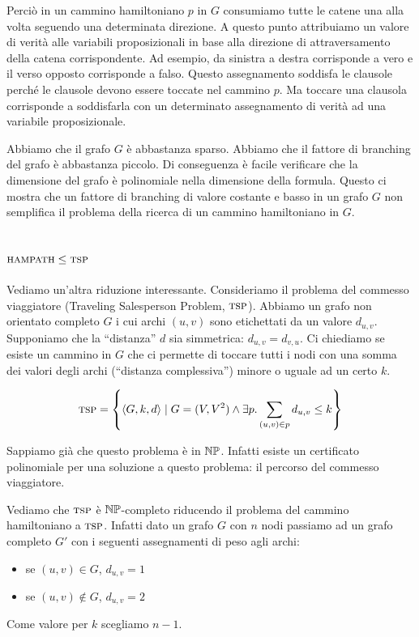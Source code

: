 Perciò in un cammino hamiltoniano $p$ in $G$ consumiamo tutte le catene una alla volta seguendo una
determinata direzione. A questo punto attribuiamo un valore di verità alle variabili proposizionali
in base alla direzione di attraversamento della catena corrispondente. Ad esempio, da sinistra a
destra corrisponde a vero e il verso opposto corrisponde a falso. Questo assegnamento soddisfa le
clausole perché le clausole devono essere toccate nel cammino $p$. Ma toccare una clausola
corrisponde a soddisfarla con un determinato assegnamento di verità ad una variabile
proposizionale.

Abbiamo che il grafo $G$ è abbastanza sparso. Abbiamo che il fattore di branching del grafo è
abbastanza piccolo. Di conseguenza è facile verificare che la dimensione del grafo è polinomiale
nella dimensione della formula. Questo ci mostra che un fattore di branching di valore costante e
basso in un grafo $G$ non semplifica il problema della ricerca di un cammino hamiltoniano in $G$.

\subsection{$\textsc{hampath} \leq \textsc{tsp}$}

Vediamo un'altra riduzione interessante. Consideriamo il problema del commesso viaggiatore
(Traveling Salesperson Problem, $\textsc{tsp}$). Abbiamo un grafo non orientato completo $G$ i cui archi
$(u,v)$ sono etichettati da un valore $d_{u,v}$. Supponiamo che la ``distanza'' $d$ sia simmetrica:
$d_{u,v} = d_{v,u}$. Ci chiediamo se esiste un cammino in $G$ che ci permette di toccare tutti i
nodi con una somma dei valori degli archi (``distanza complessiva'') minore o uguale ad un certo
$k$.

\begin{equation*}
    \textsc{tsp} = \left\{\langle G,k,d \rangle \mid G = (V,V^{2}) \land \exists p. \sum_{(u,v)\in p}d_{u,v} \leq k\right\}
\end{equation*}

Sappiamo già che questo problema è in $\mathbb{NP}$. Infatti esiste un certificato polinomiale per
una soluzione a questo problema: il percorso del commesso viaggiatore.

Vediamo che $\textsc{tsp}$ è $\mathbb{NP}$-completo riducendo il problema del cammino hamiltoniano a $\textsc{tsp}$.
Infatti dato un grafo $G$ con $n$ nodi passiamo ad un grafo completo $G'$ con i seguenti
assegnamenti di peso agli archi:
\begin{itemize}
    \item se $(u,v) \in G$, $d_{u,v} = 1$ 
    \item se $(u,v) \notin G$, $d_{u,v} = 2$ 
\end{itemize}
Come valore per $k$ scegliamo $n-1$.

